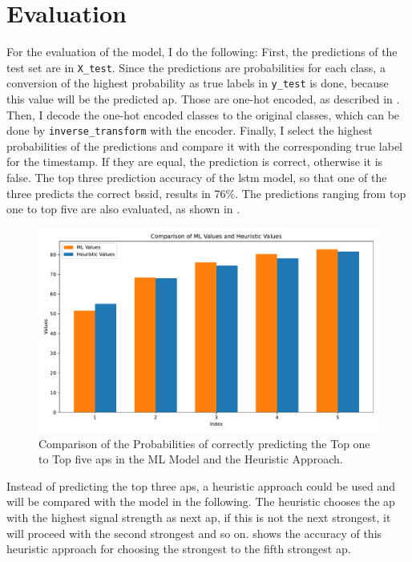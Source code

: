 \chapter{Evaluation}\label{ch:evaluation}

For the evaluation of the model, I do the following:
First, the predictions of the test set are in \texttt{X\_test}.
Since the predictions are probabilities for each class, a conversion of the highest probability as true labels in \texttt{y\_test} is done, because this value will be the predicted \ac{ap}.
Those are one-hot encoded, as described in .
Then, I decode the one-hot encoded classes to the original classes, which can be done by \texttt{inverse\_transform} with the encoder.
Finally, I select the highest probabilities of the predictions and compare it with the corresponding true label for the timestamp.
If they are equal, the prediction is correct, otherwise it is false.
The top three prediction accuracy of the \ac{lstm} model, so that one of the three predicts the correct \ac{bssid}, results in 76\%.
The predictions ranging from top one to top five are also evaluated, as shown in .

\begin{figure}[h]
    \centering
    \includegraphics*[scale=0.53]{images/comparison_ml_heuristic_1_to_5.pdf}
    \caption{Comparison of the Probabilities of correctly predicting the Top one to Top five \acp{ap} in the ML Model and the Heuristic Approach.}
    \label{fig:comparison_ml_heuristic_1_to_5}
\end{figure}

Instead of predicting the top three \acp{ap}, a heuristic approach could be used and will be compared with the model in the following.
The heuristic chooses the \ac{ap} with the highest signal strength as next \ac{ap}, if this is not the next strongest, it will proceed with the second strongest and so on.
 shows the accuracy of this heuristic approach for choosing the strongest to the fifth strongest \ac{ap}.

